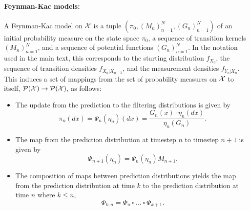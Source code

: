 \documentclass[11pt]{article}
\theoremstyle{thmstylethree}%
\begin{document}
\paragraph{\bf Feynman-Kac models:} A Feynman-Kac model on ${\mathcal{X}}$ is a tuple $(\pi_0, (M_n)_{n=1}^N, (G_n)_{n=1}^N)$ of an initial probability measure on the state space $\pi_0$, a sequence of transition kernels $(M_n)_{n=1}^N$, and a sequence of potential functions $(G_n)_{n=1}^N$. In the notation used in the main text, this corresponds to the starting distribution $f_{X_0}$, the sequence of transition densities $f_{X_{n}|X_{n-1}}$, and the measurement densities $f_{Y_n|X_n}$. This induces a set of mappings from the set of probability measures on ${\mathcal{X}}$ to itself, $\mathcal{P}({\mathcal{X}}) \to \mathcal{P}({\mathcal{X}})$, as follows:
\begin{itemize}
    \item The update from the prediction to the filtering distributions is given by 
    \begin{equation}
    \pi_n(dx) = \Psi_n(\eta_n)(dx) = \frac{G_n(x)\cdot\eta_n(dx)}{\eta_n(G_n)}.
    \end{equation}
    \item The map from the prediction distribution at timestep $n$ to timestep $n+1$ is given by 
    \begin{equation}
 \Phi_{n+1}(\eta_n) = \Psi_n(\eta_n) M_{n+1}.       
    \end{equation}
    \item The composition of maps between prediction distributions yields the map from the prediction distribution at time $k$ to the prediction distribution at time $n$ where $k \leq n$,
    \begin{equation}
 \Phi_{k,n} = \Phi_n \circ ... \circ \Phi_{k+1}.       
    \end{equation}
\end{itemize}
\end{document}
